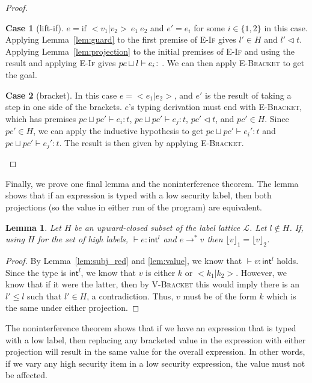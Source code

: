 \documentclass[a4paper,twocolumn]{article}
\newcommand{\typeRule}[3]{#1 \vdash #2 \colon #3}
\newcommand{\guards}[0]{\lhd}
\newcommand{\lift}[1]{\lfloor #1 \rfloor}
\theoremstyle{plain}
\newtheorem{lemma}{Lemma}
\theoremstyle{definition}
\newtheorem*{case}{Case}
\begin{document}
\begin{proof}
  \begin{case}[lift-if]
    $e = \text{if } <v_1 | v_2> \: e_1 \: e_2$ and $e' = e_i$ for some $i \in
    \{1, 2\}$ in this case.  Applying Lemma~\ref{lem:guard} to the first premise
    of \textsc{E-If} gives $l' \in H$ and $l' \guards t$.  Applying
    Lemma~\ref{lem:projection} to the initial premises of \textsc{E-If} and using
    the result and applying \textsc{E-If} gives $\typeRule{pc \sqcup l}{e_i}$.
    We can then apply \textsc{E-Bracket} to get the goal.
  \end{case}

  \begin{case}[bracket]
    In this case $e = <e_1 | e_2>$, and $e'$ is the result of taking a step in
    one side of the brackets.  $e$'s typing derivation must end with
    \textsc{E-Bracket}, which has premises $\typeRule{pc \sqcup pc'}{e_i}{t}$,
    $\typeRule{pc \sqcup pc'}{e_j}{t}$, $pc' \guards t$, and $pc' \in H$.  Since
    $pc' \in H$, we can apply the inductive hypothesis to get $\typeRule{pc
    \sqcup pc'}{e_i'}{t}$ and $\typeRule{pc \sqcup pc'}{e_j'}{t}$.  The result
    is then given by applying \textsc{E-Bracket}.
  \end{case}
\end{proof}

Finally, we prove one final lemma and the noninterference theorem.  The lemma
shows that if an expression is typed with a low security label, then both
projections (so the value in either run of the program) are equivalent.

\begin{lemma}
  \label{lem:final_support}
  Let $H$ be an upward-closed subset of the label lattice $\mathcal{L}$.  Let $l
  \not\in H$.  If, using $H$ for the set of high labels, $\typeRule{
  }{e}{\textsf{int}^l}$ and $e \to^* v$ then $\lift{v}_1 = \lift{v}_2$.
\end{lemma}
\begin{proof}
  By Lemma~\ref{lem:subj_red} and \ref{lem:value}, we know that $\typeRule{
  }{v}{\textsf{int}^l}$ holds.  Since the type is $\textsf{int}^l$, we know that
  $v$ is either $k$ or $< k_1 | k_2 >$.  However, we know that if it were the
  latter, then by \textsc{V-Bracket} this would imply there is an $l' \leq l$
  such that $l' \in H$, a contradiction.  Thus, $v$ must be of the form $k$
  which is the same under either projection.
\end{proof}

The noninterference theorem shows that if we have an expression that is typed
with a low label, then replacing any bracketed value in the expression with
either projection will result in the same value for the overall expression.  In
other words, if we vary any high security item in a low security expression, the
value must not be affected.
\end{document}
